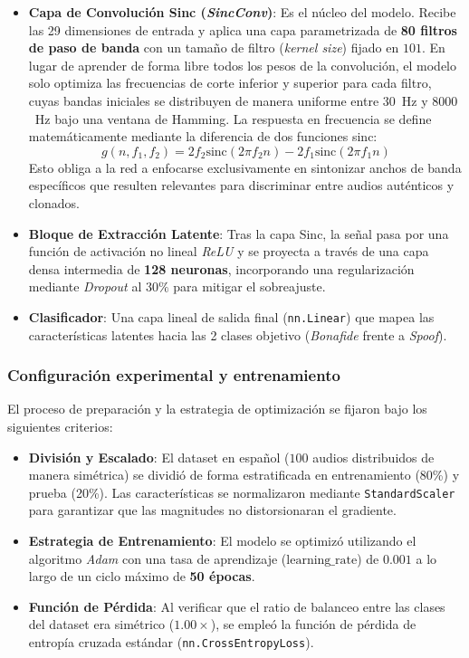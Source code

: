 \begin{itemize}
    \item \textbf{Capa de Convolución Sinc (\textit{SincConv})}: Es el núcleo del modelo. Recibe las 29 dimensiones de entrada y aplica una capa parametrizada de \textbf{80 filtros de paso de banda} con un tamaño de filtro (\textit{kernel size}) fijado en $101$. En lugar de aprender de forma libre todos los pesos de la convolución, el modelo solo optimiza las frecuencias de corte inferior y superior para cada filtro, cuyas bandas iniciales se distribuyen de manera uniforme entre $30$~Hz y $8000$~Hz bajo una ventana de Hamming. La respuesta en frecuencia se define matemáticamente mediante la diferencia de dos funciones sinc:
    $$g(n, f_1, f_2) = 2f_2 \text{sinc}(2\pi f_2 n) - 2f_1 \text{sinc}(2\pi f_1 n)$$
    Esto obliga a la red a enfocarse exclusivamente en sintonizar anchos de banda específicos que resulten relevantes para discriminar entre audios auténticos y clonados.
    \item \textbf{Bloque de Extracción Latente}: Tras la capa Sinc, la señal pasa por una función de activación no lineal \textit{ReLU} y se proyecta a través de una capa densa intermedia de \textbf{128 neuronas}, incorporando una regularización mediante \textit{Dropout} al $30\%$ para mitigar el sobreajuste.
    \item \textbf{Clasificador}: Una capa lineal de salida final (\texttt{nn.Linear}) que mapea las características latentes hacia las 2 clases objetivo (\textit{Bonafide} frente a \textit{Spoof}).
\end{itemize}

\subsubsection*{Configuración experimental y entrenamiento}

El proceso de preparación y la estrategia de optimización se fijaron bajo los siguientes criterios:

\begin{itemize}
    \item \textbf{División y Escalado}: El dataset en español ($100$ audios distribuidos de manera simétrica) se dividió de forma estratificada en entrenamiento (80\%) y prueba (20\%). Las características se normalizaron mediante \texttt{StandardScaler} para garantizar que las magnitudes no distorsionaran el gradiente.
    \item \textbf{Estrategia de Entrenamiento}: El modelo se optimizó utilizando el algoritmo \textit{Adam} con una tasa de aprendizaje ($\text{learning\_rate}$) de $0.001$ a lo largo de un ciclo máximo de \textbf{50 épocas}.
    \item \textbf{Función de Pérdida}: Al verificar que el ratio de balanceo entre las clases del dataset era simétrico ($1.00\times$), se empleó la función de pérdida de entropía cruzada estándar (\texttt{nn.CrossEntropyLoss}).
\end{itemize}